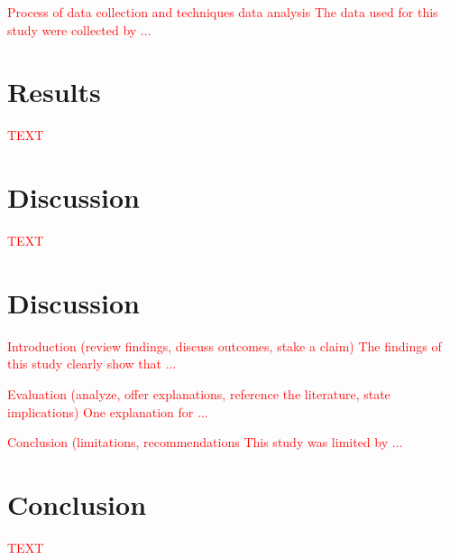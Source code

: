 \documentclass{article}
\begin{document}
\textcolor{red}{Process of data collection and techniques data analysis} 
\textcolor{red}{The data used for this study were collected by ...} 

\section{Results}

\textcolor{red}{TEXT}

\section{Discussion}

\textcolor{red}{TEXT}
 
\section{Discussion}

\textcolor{red}{Introduction (review findings, discuss outcomes, stake a claim)}
\textcolor{red}{The findings of this study clearly show that ...}

\textcolor{red}{Evaluation (analyze, offer explanations, reference the literature, state implications)}
\textcolor{red}{One explanation for ...}

\textcolor{red}{Conclusion (limitations, recommendations}
\textcolor{red}{This study was limited by ...}

\section{Conclusion}

\textcolor{red}{TEXT}

\end{document}
